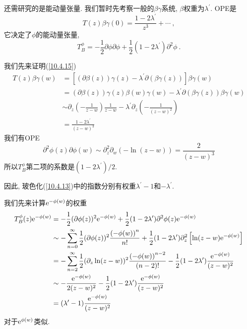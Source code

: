 还需研究的是能动量张量. 我们暂时先考察一般的$ \beta\gamma $系统, $\beta $权重为$ \lambda^{\prime}$. OPE是
\begin{equation}
    T(z)\beta\gamma(0) = \frac{1-2\lambda^{\prime}}{z^{3}}+\cdots \:, \label{10.4.15}
\end{equation}
它决定了$ \phi $的能动量张量,
\begin{equation}
    T_{B}^{\phi}=-\frac{1}{2}\partial\phi \partial\phi +\frac{1}{2}(1-2\lambda^{\prime})\partial^{2}\phi\:. \label{10.4.16}
\end{equation}
\begin{tcolorbox}
我们先来证明(\ref{10.4.15})
\begin{align*}
T(z)\beta \gamma (w) &=[(\partial \beta (z))\gamma (z)-\lambda ^{\prime
}\partial (\beta \gamma (z))]\beta \gamma (w) \\
&=(\partial \beta (z))\gamma (z)\beta (w)\gamma (w)-\lambda ^{\prime
}\partial (\beta \gamma (z))\beta \gamma (w) \\
&\sim \partial _{z}(-\frac{1}{z-w})\frac{1}{z-w}-\lambda ^{\prime }\partial
_{z}\left( -\frac{1}{(z-w)^{2}}\right)  \\
&=\frac{1-2\lambda ^{\prime }}{(z-w)^{3}}
\end{align*}%
我们有OPE%
\[
\partial ^{2}\phi (z)\partial \phi (w)\sim \partial _{z}^{2}\partial
_{w}(-\ln (z-w))=\frac{2}{(z-w)^{3}}
\]%
所以$ T_{B}^{\phi} $第二项的系数是$(1-2\lambda ^{\prime })/2$.
\end{tcolorbox}
\noindent 因此, 玻色化(\ref{10.4.13})中的指数分别有权重$ \lambda^{\prime}-1 $和$ -\lambda^{\prime}$.
\begin{tcolorbox}
我们先来计算$ \mathrm{e}^{-\phi(w)} $的权重
\begin{align*}
T_{B}^{\phi }(z)\me^{-\phi (w)} &=-\frac{1}{2}(\partial \phi (z))^{2}\me^{-\phi
(w)}+\frac{1}{2}(1-2\lambda ^{\prime })\partial ^{2}\phi (z)\me^{-\phi (w)} \\
&\sim -\sum_{n=0}^{\infty }\frac{1}{2}(\partial \phi (z))^{2}\frac{\left(
-\phi (w)\right) ^{n}}{n!}+\frac{1}{2}(1-2\lambda ^{\prime })\partial
_{z}^{2}\left[ \ln (z-w)\me^{-\phi (w)}\right]  \\
&=-\sum_{n=2}^{\infty }\frac{1}{2}(\partial _{z}\ln (z-w))^{2}\frac{\left(
-\phi (w)\right) ^{n-2}}{(n-2)!}-\frac{1}{2}(1-2\lambda ^{\prime })\frac{%
\me^{-\phi (w)}}{(z-w)^{2}} \\
&\sim -\frac{\me^{-\phi (w)}}{2(z-w)^{2}}-\frac{1}{2}(1-2\lambda ^{\prime })%
\frac{\me^{-\phi (w)}}{(z-w)^{2}} \\
&=(\lambda ^{\prime }-1)\frac{\me^{-\phi (w)}}{(z-w)^{2}}
\end{align*}
对于$ \mathrm{e}^{\phi(w)} $类似.
\end{tcolorbox}
